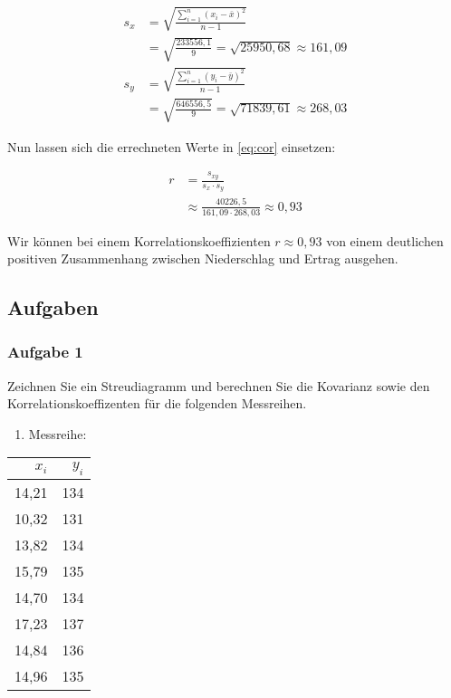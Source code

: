\documentclass[
  ngerman,
]{article}
\providecommand{\tightlist}{%
  \setlength{\itemsep}{0pt}\setlength{\parskip}{0pt}}
\begin{document}
\[\begin{aligned}
s_{x}&=\sqrt{\frac{\sum\limits^n_{i=1}(x_i-\bar{x})^2}{n-1}}\\[5pt]
     &=\sqrt{\frac{233556,1}{9}}=\sqrt{25950,68}\approx161,09\\[6pt]
s_{y}&=\sqrt{\frac{\sum\limits^n_{i=1}(y_i-\bar{y})^2}{n-1}}\\[5pt]
     &=\sqrt{\frac{646556,5}{9}}=\sqrt{71839,61} \approx268,03
\end{aligned}\]

Nun lassen sich die errechneten Werte in \autoref{eq:cor} einsetzen:

\[\begin{aligned}
r&=\frac{s_{xy}}{s_x\cdot s_y}\\[4pt]
&\approx\frac{40226,5}{161,09\cdot268,03}\approx0,93
\end{aligned}\]

Wir können bei einem Korrelationskoeffizienten \(r\approx0,93\) von einem deutlichen positiven Zusammenhang zwischen Niederschlag und Ertrag ausgehen.

\hypertarget{aufgaben-6}{%
\subsection{Aufgaben}\label{aufgaben-6}}

\hypertarget{aufgabe-1-6}{%
\subsubsection{Aufgabe 1}\label{aufgabe-1-6}}

Zeichnen Sie ein Streudiagramm und berechnen Sie die Kovarianz sowie den Korrelationskoeffizenten für die folgenden Messreihen.

\begin{enumerate}
\def\labelenumi{\alph{enumi})}
\tightlist
\item
  Messreihe:
\end{enumerate}

\begin{table}
\centering
\begin{tabular}{rr}
\toprule
$x_i$ & $y_i$\\
\midrule
14,21 & 134\\
10,32 & 131\\
13,82 & 134\\
15,79 & 135\\
14,70 & 134\\
17,23 & 137\\
14,84 & 136\\
14,96 & 135\\
\bottomrule
\end{tabular}
\end{table}
\end{document}
